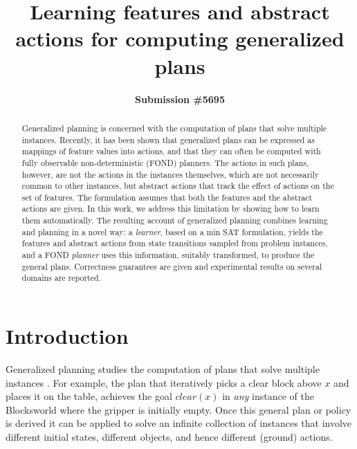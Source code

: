 \documentclass[letterpaper]{article} %
\title{Learning features and abstract actions for computing generalized plans}
\author{\textbf{Submission \#5695}}
\begin{document}
\maketitle

\begin{abstract}
  Generalized planning is concerned with the computation of plans that solve multiple instances.
  Recently, it has been shown that generalized plans can be expressed as mappings of feature
  values into actions, and that they can often be computed with fully observable non-deterministic
  (FOND) planners. %
  The actions in such plans, however, are not the actions in the instances themselves, which are
  not necessarily common to  other instances, but abstract actions that track the effect of 
  actions on the set of features. The formulation assumes that both the features and the abstract
  actions are given.
  In this work, we address this limitation by showing how to learn them automatically. 
  The resulting account of generalized planning combines learning and planning
  in a novel way: a \emph{learner}, based on a min SAT formulation, yields the features and abstract
  actions from state transitions sampled from problem instances, and a FOND \emph{planner}
  uses this information, suitably transformed, to produce the general plans.
  Correctness guarantees are given and experimental results on several domains are reported.
\end{abstract}


\section{Introduction}

Generalized planning studies the computation of plans  that   solve   multiple  instances
\cite{srivastava08learning,bonet09automatic,srivastava:generalized,hu:generalized,BelleL16,anders:generalized}.
For example, the plan  that iteratively  picks  a  clear block above $x$ 
and places it  on the table, achieves the goal $clear(x)$
in \emph{any} instance of the Blocksworld where the gripper is initially empty.
Once this  general plan or  policy is derived it can be  applied to solve an infinite collection
of instances that involve different initial states, different objects, and hence  different (ground)  actions. 
\end{document}
